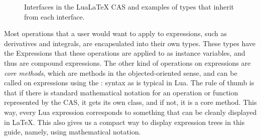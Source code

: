 \documentclass{article}
\begin{document}
\begin{figure}[h]
\centering


\caption{Interfaces in the Lua\LaTeX{} CAS and examples of types that inherit from each interface.}

\end{figure}

Most operations that a user would want to apply to expressions, such as derivatives and integrals, are encapsulated into their own types. These types have the {\ttfamily Expression}s that these operations are applied to as instance variables, and thus are compound expressions. The other kind of operations on expressions are \emph{core methods}, which are methods in the objected-oriented sense, and can be called on expressions using the {\ttfamily :} syntax as is typical in Lua. The rule of thumb is that if there is standard mathematical notation for an operation or function represented by the CAS, it gets its own class, and if not, it is a core method. This way, every Lua expression corresponds to something that can be cleanly displayed in \LaTeX{}. This also gives us a compact way to display expression trees in this guide, namely, using mathematical notation.
\end{document}
